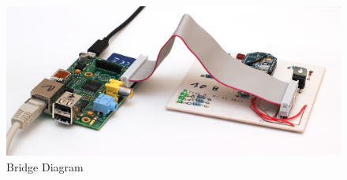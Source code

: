 \begin{figure}[H]
\begin{center}
\includegraphics[width=12cm]{images/photos/edited/master-pi2}
\end{center}
\caption{Bridge Diagram}
\label{fig:Bridge Diagram}
\end{figure}
